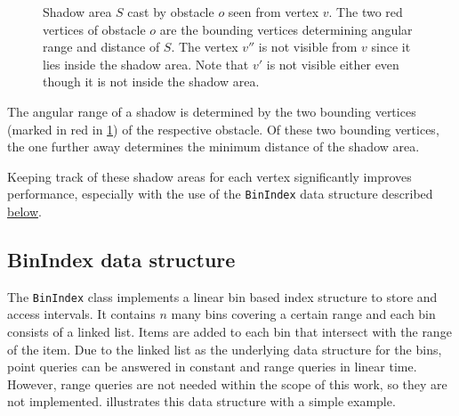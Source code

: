 \begin{figure}[h]
\begin{figcenter}
			\end{figcenter}
			\caption{Shadow area $S$ cast by obstacle $o$ seen from vertex $v$. The two red vertices of obstacle $o$ are the bounding vertices determining angular range and distance of $S$. The vertex $v''$ is not visible from $v$ since it lies inside the shadow area. Note that $v'$ is not visible either even though it is not inside the shadow area.}
			\label{fig:shadow-area}
		\end{figure}
		
		The angular range of a shadow is determined by the two bounding vertices (marked in red in \cref{fig:shadow-area}) of the respective obstacle.
		Of these two bounding vertices, the one further away determines the minimum distance of the shadow area.
		
		Keeping track of these shadow areas for each vertex significantly improves performance, especially with the use of the \texttt{BinIndex} data structure described \hyperref[subsec:binindex]{below}.
		
		
	\subsection{BinIndex data structure}
	\label{subsec:binindex}
		
		The \texttt{BinIndex} class implements a linear bin based index structure to store and access intervals.
		It contains $n$ many bins covering a certain range and each bin consists of a linked list.
		Items are added to each bin that intersect with the range of the item.
		Due to the linked list as the underlying data structure for the bins, point queries can be answered in constant and range queries in linear time.
		However, range queries are not needed within the scope of this work, so they are not implemented.
		 illustrates this data structure with a simple example.
		
